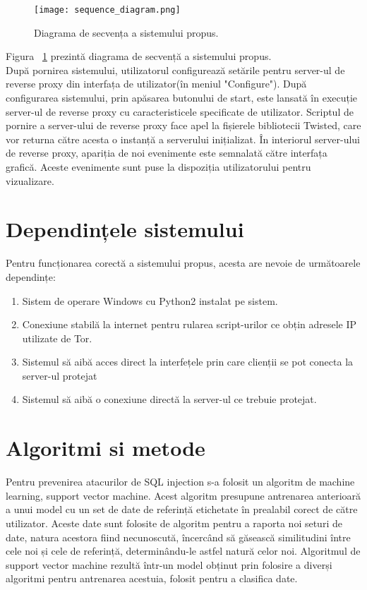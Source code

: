 \begin{figure}[h]
	\centering
	\texttt{[image: sequence\_diagram.png]}
	\caption{ Diagrama de secvența a sistemului propus. }
	\label{fig:sequence}
\end{figure}
Figura ~\ref{fig:sequence}  prezintă diagrama de secvență a sistemului propus.  \\

După pornirea sistemului, utilizatorul configurează setările pentru server-ul de reverse proxy din interfața de utilizator(în meniul "Configure"). După configurarea sistemului, prin apăsarea butonului de start, este lansată în execuție server-ul de reverse proxy cu caracteristicele specificate de utilizator. Scriptul de pornire a server-ului de reverse proxy face apel la fișierele bibliotecii Twisted, care vor returna către acesta o instanță a serverului inițializat. În interiorul server-ului de reverse proxy, apariția de noi evenimente este semnalată către interfața grafică. Aceste evenimente sunt puse la dispoziția utilizatorului pentru vizualizare. 
\\
\section{Dependințele sistemului}

Pentru funcționarea corectă a sistemului propus, acesta are nevoie de următoarele dependințe: 
\begin{enumerate}
	\item Sistem de operare Windows cu Python2 instalat pe sistem. 
	\item Conexiune stabilă la internet pentru rularea script-urilor ce obțin adresele IP utilizate de Tor. 
	\item Sistemul să aibă acces direct la interfețele prin care clienții se pot conecta la server-ul protejat 
	\item Sistemul să aibă o conexiune directă la server-ul ce trebuie protejat. 
\end{enumerate}
\section{Algoritmi si metode}

Pentru prevenirea atacurilor de SQL injection s-a folosit un algoritm de machine learning, support vector machine. Acest algoritm presupune antrenarea anterioară a unui model cu un set de date de referință etichetate în prealabil corect de către utilizator. Aceste date sunt folosite de algoritm pentru a raporta noi seturi de date, natura acestora fiind necunoscută, încercând să găsească similitudini între cele noi și cele de referință, determinându-le astfel natură celor noi. Algoritmul de support vector machine rezultă într-un model obținut prin folosire a diverși algoritmi pentru antrenarea acestuia, folosit pentru a clasifica date. 

